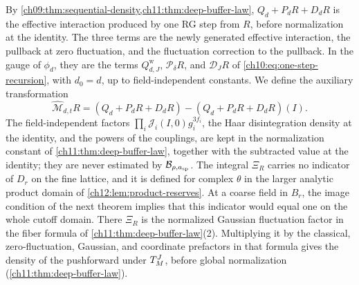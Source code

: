 By \cref{ch09:thm:sequential-density,ch11:thm:deep-buffer-law}, $Q_d+P_dR+D_dR$ is the effective interaction produced by one RG step from $R$, before normalization at the identity. The three terms are the newly generated effective interaction, the pullback at zero fluctuation, and the fluctuation correction to the pullback. In the gauge of $\phi_d$, they are the terms $Q_{d,J}^{\mathrm w}$, $\mathcal P_\delta R$, and $\mathcal D_JR$ of \eqref{ch10:eq:one-step-recursion}, with $d_0=d$, up to field-independent constants. We define the auxiliary transformation
\[
 \widehat{\mathcal M}_{d,t}R=(Q_d+P_dR+D_dR)-(Q_d+P_dR+D_dR)(I).
\]
The field-independent factors $\prod_i\mathcal J_i(I,0)g_i^{3f_i}$, the Haar disintegration density at the identity, and the powers of the couplings, are kept in the normalization constant of \cref{ch11:thm:deep-buffer-law}, together with the subtracted value at the identity; they are never estimated by $\mathcal B_{\rho,a_{\mathrm{sp}}}$. The integral $\Xi_R$ carries no indicator of $D_r$ on the fine lattice, and it is defined for complex $\theta$ in the larger analytic product domain of \cref{ch12:lem:product-reserves}. At a coarse field in $B_r$, the image condition of the next theorem implies that this indicator would equal one on the whole cutoff domain. There $\Xi_R$ is the normalized Gaussian fluctuation factor in the fiber formula of \cref{ch11:thm:deep-buffer-law}(2). Multiplying it by the classical, zero-fluctuation, Gaussian, and coordinate prefactors in that formula gives the density of the pushforward under $T_M^J$, before global normalization (\cref{ch11:thm:deep-buffer-law}).

